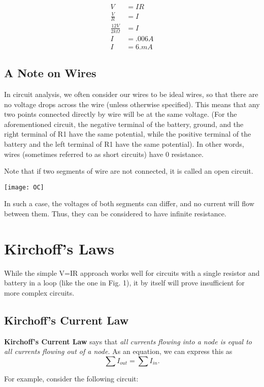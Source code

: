 \documentclass[12pt,letterpaper]{article}
\begin{document}
\begin{align}
V &= IR \\
 \frac{V}{R} &= {I} \\
 \frac{12V}{2k \Omega} &= {I} \\
I &= .006 A \\
I &= 6.mA 
\end{align} 


\subsection{A Note on Wires}
In circuit analysis, we often consider our wires to be ideal wires, so that there are no voltage drops across the wire (unless otherwise specified). This means that any two points connected directly by wire will be at the same voltage. (For the aforementioned circuit, the negative terminal of the battery, ground, and the right terminal of R1 have the same potential, while the positive terminal of the battery and the left terminal of R1 have the same potential). In other words, wires (sometimes referred to as short circuits) have 0 resistance. \par

Note that if two segments of wire are not connected, it is called an open circuit.
\begin{center}
\texttt{[image: OC]} \label{Fig. 3}
\end{center}
In such a case, the voltages of both segments can differ, and no current will flow between them. Thus, they can be considered to have infinite resistance.


\section{Kirchoff's Laws}
While the simple V=IR approach works well for circuits with a single resistor and battery in a loop (like the one in Fig. 1),  it by itself will prove insufficient for more complex circuits.

\subsection{Kirchoff's Current Law}
\textbf{Kirchoff's Current Law} says that \textit{all currents flowing into a node is equal to all currents flowing out of a node.} As an equation, we can express this as \begin{equation} \sum I_{out} = \sum I_{in}.\end{equation} \par
For example, consider the following circuit:
\end{document}
